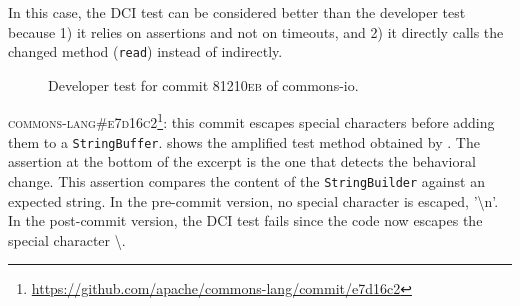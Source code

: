 In this case, the DCI test can be considered better than the developer test because
1) it relies on assertions and not on timeouts, and
2) it directly calls the changed method (\texttt{read}) instead of indirectly. 

\begin{figure}[h]
\centering
{}
\caption{Developer test for commit \textsc{81210eb} of commons-io.}
\label{fig:diff_commons-io}
\end{figure}


\textsc{commons-lang\#e7d16c2}\footnote{\url{https://github.com/apache/commons-lang/commit/e7d16c2}}: this commit escapes special characters before adding them to a \texttt{StringBuffer}.
 shows the amplified test method obtained by \DCII.
The assertion at the bottom of the excerpt is the one that detects the behavioral change.
This assertion compares the content of the \texttt{StringBuilder} against an expected string.
In the pre-commit version, no special character is escaped, \eg '\textbackslash n'.
In the post-commit version, the DCI test fails since the code now escapes the special character \textbackslash.

